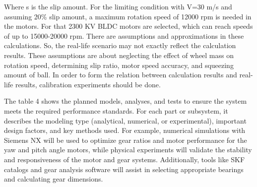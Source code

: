 \documentclass[12pt]{report}
\begin{document}
Where s is the slip amount.
For the limiting condition with V=30 m/s and assuming 20\% slip amount, a maximum rotation speed of 12000 rpm is needed in the motors. For that 2300 KV BLDC motors are selected, which can reach speeds of up to 15000-20000 rpm.
There are assumptions and approximations in these calculations. So, the real-life scenario may not exactly reflect the calculation results. These assumptions are about neglecting the effect of wheel mass on rotation speed, determining slip ratio, motor speed accuracy, and squeezing amount of ball. In order to form the relation between calculation results and real-life results, calibration experiments should be done.

The table 4 shows the planned models, analyses, and tests to ensure the system meets the required performance standards. For each part or subsystem, it describes the modeling type (analytical, numerical, or experimental), important design factors, and key methods used. For example, numerical simulations with Siemens NX will be used to optimize gear ratios and motor performance for the yaw and pitch angle motors, while physical experiments will validate the stability and responsiveness of the motor and gear systems. Additionally, tools like SKF catalogs and gear analysis software will assist in selecting appropriate bearings and calculating gear dimensions.
\end{document}
